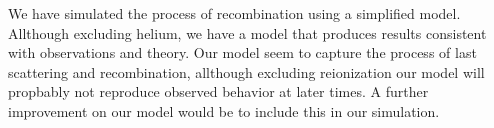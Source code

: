 \documentclass[onecolumn]{aastex62}
\begin{document}
We have simulated the process of recombination using a simplified model. Allthough excluding helium, we have a model that produces results consistent with observations and theory. Our model seem to capture the process of last scattering and recombination, allthough excluding reionization our model will propbably not reproduce observed behavior at later times. A further improvement on our model would be to include this in our simulation.






\end{document}
